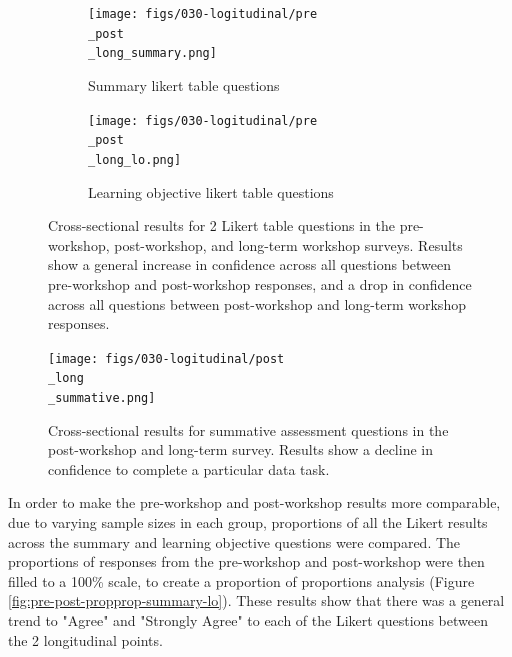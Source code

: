 \documentclass[030-workshop.tex]{subfiles}
\begin{document}
        \begin{figure}[!hbtp]
            \centering
            \begin{subfigure}[h]{0.45\textwidth}
                \centering
                \texttt{[image: figs/030-logitudinal/pre\\\_post\\\_long\_summary.png]}
                \caption[Pre-Post-workshop and Long-term Survey for summary Likert questions]
                {Summary likert table questions}
                \label{sfig:pre-post-long-summary}
            \end{subfigure}
            \hfill
            \begin{subfigure}[h]{0.45\textwidth}
                \centering
                \texttt{[image: figs/030-logitudinal/pre\\\_post\\\_long\_lo.png]}
                \caption[Pre-Post-workshop and Long-term Survey for learning objective Likert questions]
                {Learning objective likert table questions}
                \label{sfig:pre-post-long-lo}
            \end{subfigure}
            \caption[Summary table and learning objective Likert questions (pre, post, long-term)]
            {Cross-sectional results for 2 Likert table questions in the
                pre-workshop, post-workshop, and long-term workshop surveys.
                Results show a general increase in confidence across all questions between pre-workshop and post-workshop responses,
                and a drop in confidence across all questions between post-workshop and long-term workshop responses.
            }
            \label{fig:pre-post-long-summary-lo}
        \end{figure}

        \begin{figure}[!hbtp]
            \centering
            \texttt{[image: figs/030-logitudinal/post\\\_long\\\_summative.png]}
            \caption[Summative assessment Likert questions (post, long-term)]
            {Cross-sectional results for summative assessment questions in the
                post-workshop and long-term survey.
                Results show a decline in confidence to complete a particular data task.
            }
            \label{fig:post-long-summative}
        \end{figure}

        In order to make the pre-workshop and post-workshop results more comparable,
        due to varying sample sizes in each group,
        proportions of all the Likert results across the summary and learning objective questions were compared.
        The proportions of responses from the pre-workshop and post-workshop were then filled to a 100\% scale,
        to create a proportion of proportions analysis (Figure \ref{fig:pre-post-propprop-summary-lo}).
        These results show that there was a general trend to "Agree" and "Strongly Agree" to each of the Likert questions
        between the 2 longitudinal points.
\end{document}
